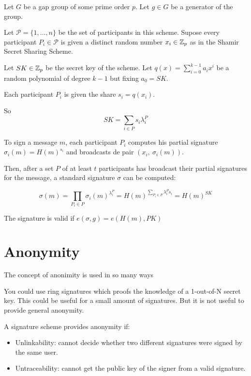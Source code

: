 Let $G$ be a gap group of some prime order $p$. Let $g \in G$ be a generator of the group.

Let $\mathcal{P}= \{ 1, \dots , n \}$ be the set of participants in this scheme. Supose every participant $P_i \in \mathcal{P}$ is given a distinct random number $x_i \in {\mathbb Z}_p$ as in the Shamir Secret Sharing Scheme.

Let $SK \in {\mathbb Z}_p$ be the secret key of the scheme. Let $q(x) = \sum_{i=0}^{k-1} a_i x^i$ be a random polynomial of degree $k-1$ but fixing $a_0 = SK$.

Each participant $P_i$ is given the share $s_i = q(x_i)$.

So $$SK = \sum_{i \in P} s_i \lambda_i^P$$

To sign a message $m$, each participant $P_i$ computes his partial signature $\sigma_i (m) = H(m)^{s_i}$ and broadcasts de pair $(x_i, \ \sigma_i (m))$.

Then, after a set $P$ of at least $t$ participants has broadcast their partial signatures for the message, a standard signature $\sigma$ can be computed:

$$ \sigma (m) = \prod_{P_i \in P} \sigma_i (m)^{\lambda_i^{P}}= H(m)^{\sum_{P_i \in P} \lambda_i^P s_i} = H(m)^{SK}$$

The signature is valid if $e(\sigma, g) = e(H(m), PK)$

\section{Anonymity}
The concept of anonimity is used in so many ways

You could use ring signatures which proofs the knowledge of a 1-out-of-N secret key. This could be useful for a small amount of signatures. But it is not useful to provide general anonymity.

A signature scheme provides anonymity if:
\begin{itemize}
    \item Unlinkability: cannot decide whether two different signatures were signed by the same user.
    \item Untraceability: cannot get the public key of the signer from a valid signature.
\end{itemize}